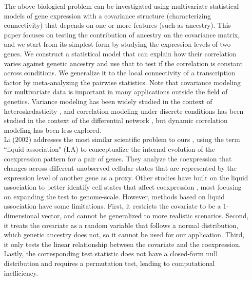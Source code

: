 \documentclass[aoas,preprint]{imsart}
\numberwithin{equation}{section}
\theoremstyle{plain}
\begin{document}
The above biological problem can be investigated using multivariate statistical models of gene expression with a covariance structure (characterizing connectivity) that depends on one or more features (such as ancestry). This paper focuses on testing the contribution of ancestry on the covariance matrix, and we start from its simplest form by studying the expression levels of two genes. We construct a statistical model that can explain how their correlation varies against genetic ancestry and use that to test if the correlation is constant across conditions. We generalize it to the local connectivity of a transcription factor by meta-analyzing the pairwise statistics. Note that covariance modeling for multivariate data is important in many applications outside the field of genetics. Variance modeling has been widely studied in the context of heteroskedasticity \cite{breusch1979simple, glejser1969new, white1980heteroskedasticity}, and correlation modeling under discrete conditions has been studied in the context of the differential network \cite{ideker2012differential}, but dynamic correlation modeling has been less explored. \\

Li (2002) addresses the most similar scientific problem to ours \cite{li2002genome, li2004system}, using the term ``liquid association" (LA) to conceptualize the internal evolution of the coexpression pattern for a pair of genes. They analyze the coexpression that changes across different unobserved cellular states that are represented by the expression level of another gene as a proxy. Other studies have built on the liquid association to better identify cell states that affect coexpression \cite{yan2017detecting, yu2018new}, most focusing on expanding the test to genome-scale. However, methods based on liquid association have some limitations. First, it restricts the covariate to be a 1-dimensional vector, and cannot be generalized to more realistic scenarios. Second, it treats the covariate as a random variable that follows a normal distribution, which genetic ancestry does not, so it cannot be used for our application. Third, it only tests the linear relationship between the covariate and the coexpression. Lastly, the corresponding test statistic does not have a closed-form null distribution and requires a permutation test, leading to computational inefficiency. \\
\end{document}
